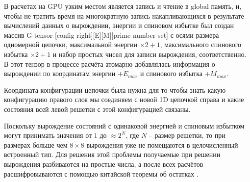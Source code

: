 
В расчетах на GPU узким местом является запись и чтение в global память, и, чтобы не тратить время на многократную запись накапливающихся в результате вычислений данных о вырождении, энергии и спиновом избытке  был создан массив G-tensor [config right][E][M][prime number set] с осями размера одномерной цепочки, максимальной энергии $\times 2 + 1$, максимального спинового избытка $\times 2 + 1$ и набор простых чисел для записи вырождения, соответственно. В этот тензор в процессе расчёта атомарно добавлялась информация о вырождении по координатам энергии $+ E_{max}$ и спинового избытка $+ M_{max}$.

Координата конфигурации цепочки была нужна для то чтобы знать какую конфигурацию правого слоя мы соединяем с новой 1D цепочкой справа и какие состояния всей левой решетки с этой конфигурацией связаны.

Поскольку вырождение состояний с одинаковой энергией и спиновым избытком могут принимать значения от $1$ до $\approx 2^{N}$, где $N$ -- размер решетки, то при размерах больше чем $8 \times 8$ вырождения уже не помещаются в целочисленный встроенный тип. Для решения этой проблемы получаемые при решении вырождения разбиваются на простые числа, а после всех расчётов расшифровываются с помощью китайской теоремы об остатках \cite{katz2007mathematics}.